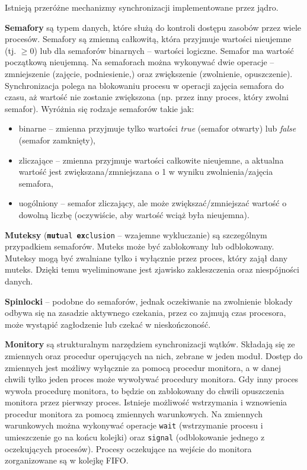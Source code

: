 Istnieją przeróżne mechanizmy synchronizacji implementowane przez jądro.

\textbf{Semafory} są typem danych, które służą do kontroli dostępu zasobów przez wiele procesów. Semafory są zmienną całkowitą, która przyjmuje wartości nieujemne (tj. $\ge 0$) lub dla semaforów binarnych -- wartości logiczne. Semafor ma wartość początkową nieujemną. Na semaforach można wykonywać dwie operacje -- zmniejszenie (zajęcie, podniesienie,) oraz zwiększenie (zwolnienie, opuszczenie). Synchronizacja polega na blokowaniu procesu w operacji zajęcia semafora do czasu, aż wartość nie zostanie zwiększona (np. przez inny proces, który zwolni semafor). Wyróżnia się rodzaje semaforów takie jak:
\begin{itemize}
\item binarne -- zmienna przyjmuje tylko wartości \textit{true} (semafor otwarty) lub \textit{false} (semafor zamknięty),
\item zliczające -- zmienna przyjmuje wartości całkowite nieujemne, a aktualna wartość jest zwiększana/zmniejszana o 1 w wyniku zwolnienia/zajęcia semafora,
\item uogólniony -- semafor zliczający, ale może zwiększać/zmniejszać wartość o dowolną liczbę (oczywiście, aby wartość wciąż była nieujemna).
\end{itemize}

\textbf{Muteksy} (\texttt{\textbf{mut}ual \textbf{ex}clusion} -- wzajemne wykluczanie) są szczególnym przypadkiem semaforów. Muteks może być zablokowany lub odblokowany. Muteksy mogą być zwalniane tylko i wyłącznie przez proces, który zajął dany muteks. Dzięki temu wyeliminowane jest zjawisko zakleszczenia oraz niespójności danych.

\textbf{Spinlocki} -- podobne do semaforów, jednak oczekiwanie na zwolnienie blokady odbywa się na zasadzie aktywnego czekania, przez co zajmują czas procesora, może wystąpić zagłodzenie lub czekać w nieskończoność.

\textbf{Monitory} są strukturalnym narzędziem synchronizacji wątków. Składają się ze zmiennych oraz procedur operujących na nich, zebrane w jeden moduł. Dostęp do zmiennych jest możliwy wyłącznie za pomocą procedur monitora, a w danej chwili tylko jeden proces może wywoływać procedury monitora. Gdy inny proces wywoła procedurę monitora, to będzie on zablokowany do chwili opuszczenia monitora przez pierwszy proces. Istnieje możliwość wstrzymania i wznowienia procedur monitora za pomocą zmiennych warunkowych. Na zmiennych warunkowych można wykonywać operacje \texttt{wait} (wstrzymanie procesu i umieszczenie go na końcu kolejki) oraz \texttt{signal} (odblokowanie jednego z oczekujących procesów). Procesy oczekujące na wejście do monitora zorganizowane są w kolejkę FIFO.